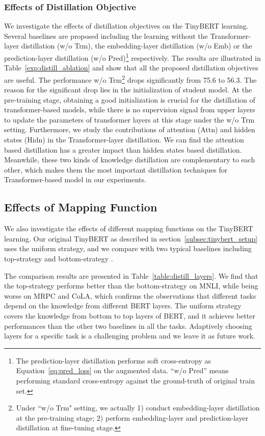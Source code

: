 \documentclass[11pt,a4paper]{article}
\begin{document}
\subsubsection{Effects of Distillation Objective} We investigate the effects of distillation objectives on the TinyBERT learning. Several baselines are proposed including the learning without the Transformer-layer distillation (w/o Trm), the embedding-layer distillation (w/o Emb) or the prediction-layer distillation (w/o Pred)\footnote{The prediction-layer distillation performs soft cross-entropy as Equation~\ref{eq:pred_loss} on the augmented data. ``w/o Pred'' means performing standard cross-entropy against the ground-truth of original train set.} respectively. The results are illustrated in Table~\ref{exp:distill_ablation} and show that all the proposed distillation objectives are useful. 
The performance w/o Trm\footnote{Under ``w/o Trm" setting, we actually 1) conduct embedding-layer distillation at the pre-training stage; 2) perform embedding-layer and prediction-layer distillation at fine-tuning stage.} drops significantly from 75.6 to 56.3. The reason for the significant drop lies in the initialization of student model. At the pre-training stage, obtaining a good initialization is crucial for the distillation of transformer-based models, while there is no supervision signal from upper layers to update the parameters of transformer layers at this stage under the w/o Trm setting. Furthermore, we study the contributions of attention (Attn) and hidden states (Hidn) in the Transformer-layer distillation. We can find the attention based distillation has a greater impact than hidden states based distillation. Meanwhile, these two kinds of knowledge distillation are complementary to each other, which makes them the most important distillation techniques for Transformer-based model in our experiments. 



\subsection{Effects of Mapping Function}
\label{exp:distill_layers}
We also investigate the effects of different mapping functions  on the TinyBERT learning. Our original TinyBERT as described in section~\ref{subsec:tinybert_setup} uses the uniform strategy, and we compare with two typical baselines including top-strategy  and bottom-strategy . 

The comparison results are presented in Table~\ref{table:distill_layers}. We find that the top-strategy performs better than the bottom-strategy on MNLI, while being worse on MRPC and CoLA, which confirms the observations that different tasks depend on the knowledge from different BERT layers. The uniform strategy covers the knowledge from bottom to top layers of BERT, and it achieves better performances than the other two baselines in all the tasks. Adaptively choosing layers for a specific task is a challenging problem and we leave it as future work.
\end{document}
